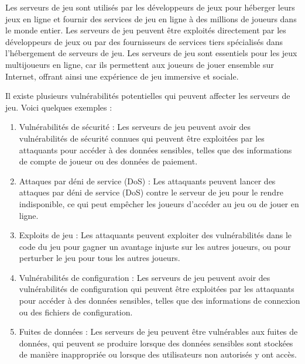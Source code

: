 Les serveurs de jeu sont utilisés par les développeurs de jeux pour héberger leurs jeux en ligne et fournir des services de jeu en ligne à des millions de joueurs dans le monde entier. Les serveurs de jeu peuvent être exploités directement par les développeurs de jeux ou par des fournisseurs de services tiers spécialisés dans l'hébergement de serveurs de jeu. Les serveurs de jeu sont essentiels pour les jeux multijoueurs en ligne, car ils permettent aux joueurs de jouer ensemble sur Internet, offrant ainsi une expérience de jeu immersive et sociale.
 

Il existe plusieurs vulnérabilités potentielles qui peuvent affecter les serveurs de jeu. Voici quelques exemples :
\begin{enumerate}
\item   Vulnérabilités de sécurité : Les serveurs de jeu peuvent avoir des vulnérabilités de sécurité connues qui peuvent être exploitées par les attaquants pour accéder à des données sensibles, telles que des informations de compte de joueur ou des données de paiement.
	
	\item   Attaques par déni de service (DoS) : Les attaquants peuvent lancer des attaques par déni de service (DoS) contre le serveur de jeu pour le rendre indisponible, ce qui peut empêcher les joueurs d'accéder au jeu ou de jouer en ligne.
	
	\item   Exploits de jeu : Les attaquants peuvent exploiter des vulnérabilités dans le code du jeu pour gagner un avantage injuste sur les autres joueurs, ou pour perturber le jeu pour tous les autres joueurs.
	
	\item   Vulnérabilités de configuration : Les serveurs de jeu peuvent avoir des vulnérabilités de configuration qui peuvent être exploitées par les attaquants pour accéder à des données sensibles, telles que des informations de connexion ou des fichiers de configuration.
	
\item   Fuites de données : Les serveurs de jeu peuvent être vulnérables aux fuites de données, qui peuvent se produire lorsque des données sensibles sont stockées de manière inappropriée ou lorsque des utilisateurs non autorisés y ont accès.
\end{enumerate}

